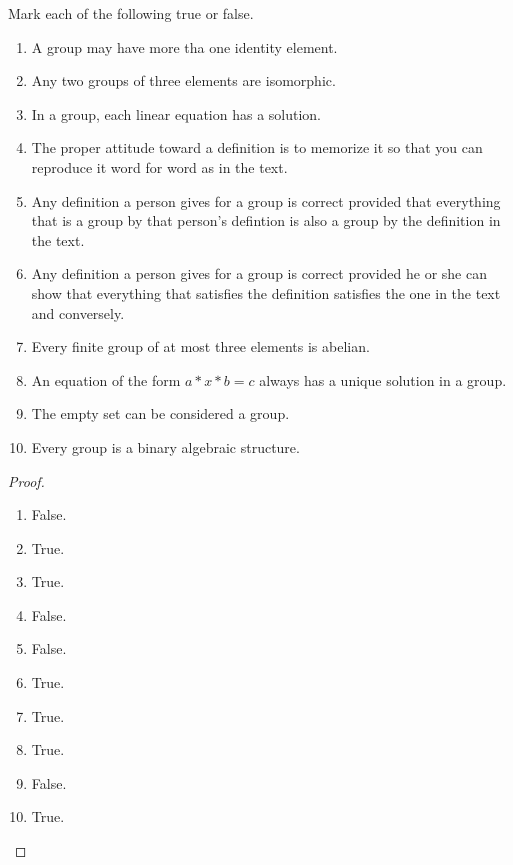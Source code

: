 \newpage
\begin{exercise}
    Mark each of the following true or false.
    \begin{enumerate}[label={\textbf{\alph*.}}]
        \item A group may have more tha one identity element.
        \item Any two groups of three elements are isomorphic.
        \item In a group, each linear equation has a solution.
        \item The proper attitude toward a definition is to memorize it so that you can reproduce it word for word as in the text.
        \item Any definition a person gives for a group is correct provided that everything that is a group by that person's defintion is also a group by the definition in the text.
        \item Any definition a person gives for a group is correct provided he or she can show that everything that satisfies the definition satisfies the one in the text and conversely.
        \item Every finite group of at most three elements is abelian.
        \item An equation of the form $a * x * b = c$ always has a unique solution in a group.
        \item The empty set can be considered a group.
        \item Every group is a binary algebraic structure.
    \end{enumerate}
\end{exercise}

\begin{proof}
    \begin{enumerate}[label={\textbf{\alph*.}}]
        \item False.
        \item True.
        \item True.
        \item False.
        \item False.
        \item True.
        \item True.
        \item True.
        \item False.
        \item True.
    \end{enumerate}
\end{proof}

